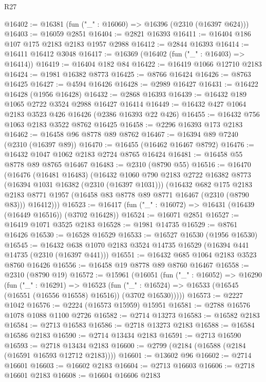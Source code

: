 \begin{lexlean}{R27}
\begin{coremodule}
@16402 := @16381 (fun ("_" : @16060) => @16396 (@2310 (@16397 @624)))
@16403 := @16059 @2851
@16404 := @2821 @16393
@16411 := @16404 @186 @107 @175 @2183 @2183 @1957 @2988
@16412 := @2844 @16393
@16414 := @16411 @16412 @3048
@16417 := @16369 (@16402 (fun ("_" : @16403) => @16414))
@16419 := @16404 @182 @84
@16422 := @16419 @1066 @12710 @2183
@16424 := @1981 @16382 @8773
@16425 := @8766 @16424
@16426 := @8763 @16425
@16427 := @4594 @16426
@16428 := @2989 @16427
@16431 := @16422 @16428 (@1956 @16428)
@16432 := @2868 @16393
@16439 := @16432 @189 @1065 @2722 @3524 @2988 @16427 @16414
@16449 := @16432 @427 @1064 @2183 @3523 @426 @16426 (@2386 @16393 @22 @426)
@16455 := @16432 @756 @1063 @2183 @3522 @8762 @16425
@16458 := @2296 @16393 @173 @2183
@16462 := @16458 @96 @8778 @89 @8762
@16467 := @16394 @89 @7240 (@2310 (@16397 @89))
@16470 := @16455 (@16462 @16467 @8792)
@16476 := @16432 @1047 @1062 @2183 @2724 @8765 @16424
@16481 := @16458 @55 @8778 @89 @8765 @16467
@16483 := @2310 (@8790 @55)
@16516 := @16470
    (@16476
      (@16481 @16483)
      (@16432
        @1060
        @790
        @2183
        @2722
        @16382
        @8773
        (@16394 @1031 @16382 (@2310 (@16397 @1031)))
        (@16432
          @682
          @175
          @2183
          @2183
          @8771
          @1957
          (@16458 @83 @8778 @89 @8771 @16467 (@2310 (@8790 @83)))
          @16412)))
@16523 := @16417 (fun ("_" : @16072) => @16431 (@16439 (@16449 @16516)) (@3702 @16428))
@16524 := @16071 @2851
@16527 := @16419 @1071 @3525 @2183
@16528 := @1981 @14735
@16529 := @8761 @16426
@16530 := @16528 @16529
@16533 := @16527 @16530 (@1956 @16530)
@16545 := @16432 @638 @1070 @2183 @3524 @14735 @16529 (@16394 @441 @14735 (@2310 (@16397 @441)))
@16551 := @16432 @685 @1064 @2183 @3523 @8760 @16426
@16556 := @16458 @19 @8778 @89 @8760 @16467
@16558 := @2310 (@8790 @19)
@16572 := @15961
    (@16051
      (fun ("_" : @16052) =>
      @16290
        (fun ("_" : @16291) =>
        @16523
          (fun ("_" : @16524) => @16533 (@16545 (@16551 (@16556 @16558) @16516)) (@3702 @16530)))))
@16573 := @2227 @1042
@16576 := @2224 (@16573 @15959) @15951
@16581 := @2788 @16576 @1078 @1088 @1100 @2726
@16582 := @2714 @13273
@16583 := @16582 @2183
@16584 := @2713 @16583
@16586 := @2718 @13273 @2183
@16588 := @16584 @16586 @2183
@16590 := @2714 @13434 @2183
@16591 := @2713 @16590
@16593 := @2718 @13434 @2183
@16600 := @2799 (@2184 (@16588 (@2184 (@16591 @16593 @12712 @2183))))
@16601 := @13602 @96
@16602 := @2714 @16601
@16603 := @16602 @2183
@16604 := @2713 @16603
@16606 := @2718 @16601 @2183
@16608 := @16604 @16606 @2183

\end{coremodule}
\end{lexlean}
